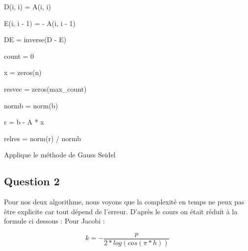 \documentclass[11pt]{article}
\DeclarePairedDelimiter{\norm}{\lVert}{\rVert}
\begin{document}
\begin{algorithm} [H]
  \SetAlgoLined
  
   {
    D(i, i) = A(i, i) 
  }

   {
    E(i, i - 1) = - A(i, i - 1) 
  }

  DE = inverse(D - E) 

  count = 0 

  x = zeros(n) 

  resvec = zeros(max\_count) 

  normb = norm(b) 

  r = b - A * x 

  relres = norm(r) / normb 


  \caption{Applique le méthode de Gauss Seidel}
\end{algorithm}

\subsection{Question 2}

Pour nos deux algorithme, nous voyons que la complexité en temps ne
peux pas être explicite car tout dépend de l'erreur. D'après le cours
on était réduit à la formule ci dessous :\newline
\vspace{5mm}
Pour Jacobi :

\begin{equation*}
  k = - \frac{p}{2 * log(cos(\pi * h))}
\end{equation*}
\end{document}

